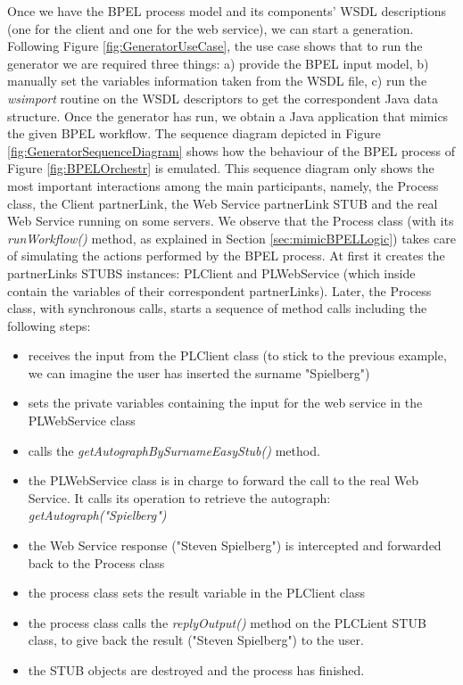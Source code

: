 Once we have the BPEL process model and its components' WSDL descriptions (one for the client and one for the web service), we can start a generation. Following Figure \ref{fig:GeneratorUseCase}, the use case shows that to run the generator we are required three things: a) provide the BPEL input model, b) manually set the variables information taken from the WSDL file, c) run the \textit{wsimport} routine on the WSDL descriptors to get the correspondent Java data structure.
Once the generator has run, we obtain a Java application that mimics the given BPEL workflow. The sequence diagram depicted in Figure \ref{fig:GeneratorSequenceDiagram} shows how the behaviour of the BPEL process of Figure \ref{fig:BPELOrchestr} is emulated. This sequence diagram only shows the most important interactions among the main participants, namely, the Process class, the Client partnerLink, the Web Service partnerLink STUB and the real Web Service running on some servers. 
We observe that the Process class (with its \textit{runWorkflow()} method, as explained in Section \ref{sec:mimicBPELLogic}) takes care of simulating the actions performed by the BPEL process. At first it creates the partnerLinks STUBS instances: PLClient and PLWebService (which inside contain the variables of their correspondent partnerLinks). Later, the Process class, with synchronous calls, starts a sequence of method calls including the following steps:
\begin{itemize}
 \item receives the input from the PLClient class (to stick to the previous example, we can imagine the user has inserted the surname "Spielberg")
 \item sets the private variables containing the input for the web service in the PLWebService class
 \item calls the \textit{getAutographBySurnameEasyStub()} method.
 \item the PLWebService class is in charge to forward the call to the real Web Service. It calls its operation to retrieve the autograph: \textit{getAutograph("Spielberg")}
 \item the Web Service response ("Steven Spielberg") is intercepted and forwarded back to the Process class
 \item the process class sets the result variable in the PLClient class
 \item the process class calls the \textit{replyOutput()} method on the PLCLient STUB class, to give back the result ("Steven Spielberg") to the user.
 \item the STUB objects are destroyed and the process has finished.
\end{itemize}

